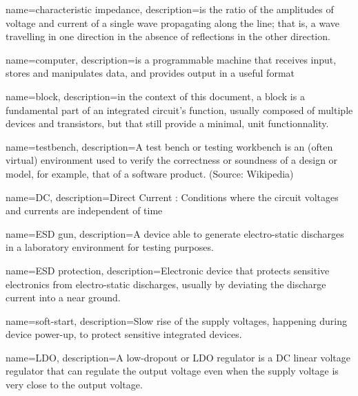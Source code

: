 %
%

{
  name=characteristic impedance,
  description={is the ratio of the amplitudes of voltage and current of a
               single wave propagating along the line;
               that is, a wave travelling in one direction in the absence of
               reflections in the other direction.}
}

{
  name=computer,
  description={is a programmable machine that receives input,
               stores and manipulates data, and provides
               output in a useful format}
}

{
  name=block,
  description={in the context of this document,
               a block is a fundamental part of an integrated circuit's function,
               usually composed of multiple devices and transistors,
               but that still provide a minimal, unit functionnality.}
}

{
  name=testbench,
  description={A test bench or testing workbench is an (often virtual)
               environment used to verify the correctness or soundness of a
               design or model, for example, that of a software product.
               (Source: Wikipedia)}
}

{
  name=DC,
  description={Direct Current : Conditions where the circuit voltages
               and currents are independent of time}
}

{
  name=ESD gun,
  description={A device able to generate electro-static discharges in a
               laboratory environment for testing purposes.}
}

{
  name=ESD protection,
  description={Electronic device that protects sensitive electronics from
               electro-static discharges, usually by deviating the discharge
               current into a near ground.}
}

{
  name=soft-start,
  description={Slow rise of the supply voltages, happening during device
  power-up, to protect sensitive integrated devices.}
}

{
  name=LDO,
  description={A low-dropout or LDO regulator is a DC linear voltage regulator
  that can regulate the output voltage even when the supply voltage
  is very close to the output voltage.}
}


